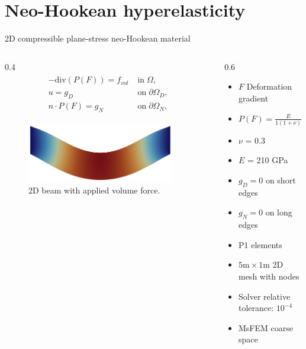 \section{Neo-Hookean hyperelasticity}

\begin{frame}{2D compressible plane-stress neo-Hookean material}
	\vspace{0mm}
	\begin{columns}
		\begin{column}{0.4\textwidth}%
			\begin{align*}
				\label{eq:nonlinelas}
				\begin{split}
					-\mathrm{div}(P(F)) = f_{vol}\; & \mathrm{in}\;\Omega,           \\
					u = g_D \;                      & \mathrm{on}\;\partial\Omega_D, \\
					n\cdot P(F) = g_N\;             & \mathrm{on}\;\partial\Omega_N,
				\end{split}
			\end{align*}
			\begin{figure}
				\centering
				\includegraphics[width=0.9\textwidth]{images/beam2D.png}
				\caption{2D beam with applied volume force.}
				\label{fig:beam2d}
			\end{figure}
		\end{column}%
		\begin{column}{0.6\textwidth}
			\vspace{-1em}
			\centering
			\begin{itemize}
				\item $F$ Deformation gradient
				\item $P(F) = \frac{E}{1(1+\nu)}(F-F^{-T}) + \frac{E\nu}{(1+\nu)(1-2\nu)}\mathrm{ln}(\mathrm{det}(F)F^{-T})$
				\item $\nu$ = 0.3
				\item $E$ = 210 GPa
        \item $g_D = 0$ on short edges
				\item $g_N = 0$ on long edges
				\item P1 elements
				\item $5\textrm{m}\times 1\textrm{m}$ 2D mesh with  nodes
        \item Solver relative tolerance: $10^{-4}$
				\item MsFEM coarse space
			\end{itemize}
		\end{column}
	\end{columns}
\end{frame}

